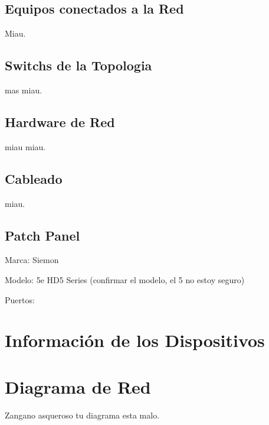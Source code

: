 \documentclass[spanish]{udpreport}
\begin{document}
\section{Equipos conectados a la Red}
Miau.

\section{Switchs de la Topologia}
mas miau.

\section{Hardware de Red}
miau miau.

\section{Cableado}
miau.

\section{Patch Panel}
Marca: Siemon

Modelo: 5e HD5 Series (confirmar el modelo, el 5 no estoy seguro)

Puertos:

\chapter{Información de los Dispositivos}

\chapter{Diagrama de Red}
Zangano asqueroso tu diagrama esta malo.

\listoffigures
\end{document}
